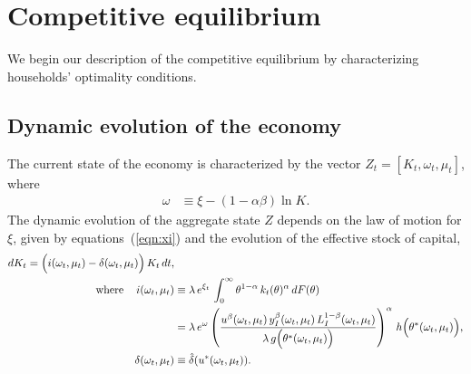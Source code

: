 \documentclass[12pt]{article}
\begin{document}
\section{Competitive equilibrium}

We begin our description of the competitive equilibrium by characterizing households' optimality conditions.


\subsection{Dynamic evolution of the economy}




The current state of the economy is characterized by the vector $Z_t=[K_t,\omega_t, \mu_t]$, where
\begin{align}
\omega& \equiv  \xi - (1-\alpha\beta) \ln K.\label{eqn:omega}
\end{align}
The dynamic evolution of the aggregate state $Z$ depends on the law of motion for $\xi$, given by equations~(\ref{eqn:xi}) and the evolution of the effective stock of capital,
\begin{align}\notag
d K_t  =\Big(i(\omega_t,\mu_t)    - \delta(\omega_t, \mu_t)  \Big) \,K_t \,dt,& \\\notag  \textrm{where}\quad\,i(\omega_t,\mu_t) & \equiv  \lambda\,  e^{\xi_t}\, \int_0^\infty  \theta^{1-\alpha} \,k_t(\theta)^\alpha \, d F(\theta) \\\notag
&=  \lambda\, e^\omega \left(\frac{  u^\beta(\omega_t,\mu_t)  \, y^{\beta}_{I}(\omega_t,\mu_t) \, L^{1-\beta}_{I}(\omega_t,\mu_t)}{ \lambda\, g\Big(\theta^*(\omega_t,\mu_t)\Big)}\right)^\alpha \, h\Big(\theta^*(\omega_t,\mu_t)\Big) ,\label{eqn:Kevol}\\
\delta(\omega_t,\mu_t) &\equiv \hat\delta(u^*(\omega_t,\mu_t) ).
\end{align}
\end{document}

